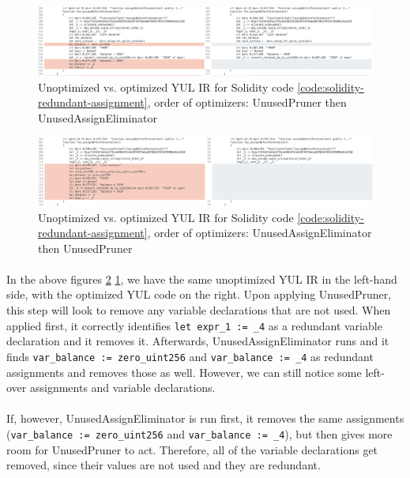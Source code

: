 \begin{figure}
    \centering
    \includegraphics[width=\textwidth]{images/optimization_order_ur.png}
    \caption{Unoptimized vs. optimized YUL IR for Solidity code \ref{code:solidity-redundant-assignment}, order of optimizers: UnusedPruner then UnusedAssignEliminator}
    \label{fig:optimization-order-ur}
\end{figure}

\begin{figure}
    \centering
    \includegraphics[width=\textwidth]{images/optimization_order_ru.png}
    \caption{Unoptimized vs. optimized YUL IR for Solidity code \ref{code:solidity-redundant-assignment}, order of optimizers: UnusedAssignEliminator then UnusedPruner}
    \label{fig:optimization-order-ru}
\end{figure}


\paragraph*{}
In the above figures \ref{fig:optimization-order-ru} \ref{fig:optimization-order-ur}, we have the same unoptimized YUL IR in the left-hand side, with the optimized YUL code on the right. Upon applying UnusedPruner, this step will look to remove any variable declarations that are not used. When applied first, it correctly identifies \lstinline[columns=fixed]{let expr_1 := _4} as a redundant variable declaration and it removes it. Afterwards, UnusedAssignEliminator runs and it finds \lstinline[columns=fixed]{var_balance := zero_uint256} and \lstinline[columns=fixed]{var_balance := _4} as redundant assignments and removes those as well. However, we can still notice some left-over assignments and variable declarations.

\paragraph*{}
If, however, UnusedAssignEliminator is run first, it removes the same assignments (\lstinline[columns=fixed]{var_balance := zero_uint256} and \lstinline[columns=fixed]{var_balance := _4}), but then gives more room for UnusedPruner to act. Therefore, all of the variable declarations get removed, since their values are not used and they are redundant.

